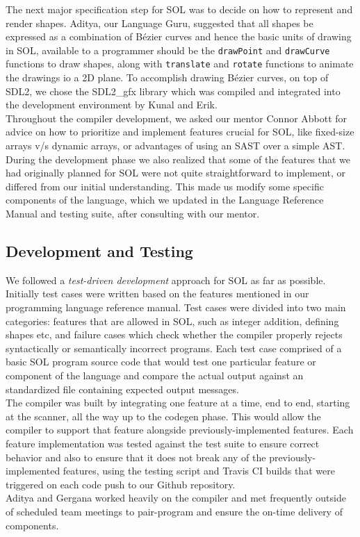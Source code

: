 \documentclass[letterpaper,12pt]{report}
\begin{document}
{      The next major specification step for SOL was to decide on how to represent and render shapes. Aditya, our Language Guru, suggested that all shapes be expressed as a combination of B\'ezier curves and hence the basic units of drawing in SOL, available to a programmer should be the \texttt{drawPoint} and \texttt{drawCurve} functions to draw shapes, along with \texttt{translate} and \texttt{rotate} functions to animate the drawings io a 2D plane. To accomplish drawing B\'ezier curves, on top of SDL2, we chose the SDL2\_gfx library which was compiled and integrated into the development environment by Kunal and Erik.\\

      Throughout the compiler development, we asked our mentor Connor Abbott for advice on how to prioritize  and implement features crucial for SOL, like fixed-size arrays v/s dynamic arrays, or advantages of using an SAST over a simple AST. During the development phase we also realized that some of the features that we had originally planned for SOL were not quite straightforward to implement, or differed from our initial understanding. This made us modify some specific components of the language, which we updated in the Language Reference Manual and testing suite, after consulting with our mentor.

    \subsection{Development and Testing}
      We followed a \textit{test-driven development} approach for SOL as far as possible. Initially test cases were written based on the features mentioned in our programming language reference manual. Test cases were divided into two main categories: features that are allowed in SOL, such as integer addition, defining shapes etc, and failure cases which check whether the compiler properly rejects syntactically or semantically incorrect programs. Each test case comprised of a basic SOL program source code that would test one particular feature or component of the language and compare the actual output against an standardized file containing expected output messages.\\

      The compiler was built by integrating one feature at a time, end to end, starting at the scanner, all the way up to the codegen phase. This would allow the compiler to support that feature alongside previously-implemented features. Each feature implementation was tested against the test suite to ensure correct behavior and also to ensure that it does not break any of the previously-implemented features, using the testing script and Travis CI builds that were triggered on each code push to our Github repository.\\
      Aditya and Gergana worked heavily on the compiler and met frequently outside of scheduled team meetings to pair-program and ensure the on-time delivery of components.\\

}
\end{document}
